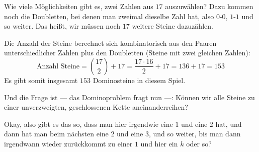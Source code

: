 \begin{spoken-clean}[00:22:30 - 00:23:51]
Wie viele Möglichkeiten gibt es, zwei Zahlen aus $17$ auszuwählen? Dazu kommen noch die Doubletten, bei denen man zweimal dieselbe Zahl hat, also $0$-$0$, $1$-$1$ und so weiter. Das heißt, wir müssen noch $17$ weitere Steine dazuzählen.
\end{spoken-clean}

\begin{ai-global-state-checkpoint-invisible-content}
\end{ai-global-state-checkpoint-invisible-content}

\begin{math-stroke}
Die Anzahl der Steine berechnet sich kombinatorisch aus den Paaren unterschiedlicher Zahlen plus den Doubletten (Steine mit zwei gleichen Zahlen):
\[
\text{Anzahl Steine} = \binom{17}{2} + 17 = \frac{17 \cdot 16}{2} + 17 = 136 + 17 = 153
\]
Es gibt somit insgesamt $153$ Dominosteine in diesem Spiel.
\end{math-stroke}

\begin{spoken-clean}[00:23:51 - 00:25:23]
Und die Frage ist --- das Dominoproblem fragt nun ---: Können wir alle Steine zu einer unverzweigten, geschlossenen Kette aneinanderreihen? 

Okay, also gibt es das so, dass man hier irgendwie eine $1$ und eine $2$ hat, und dann hat man beim nächsten eine $2$ und eine $3$, und so weiter, bis man dann irgendwann wieder zurückkommt zu einer $1$ und hier ein $k$ oder so?  
\end{spoken-clean}

